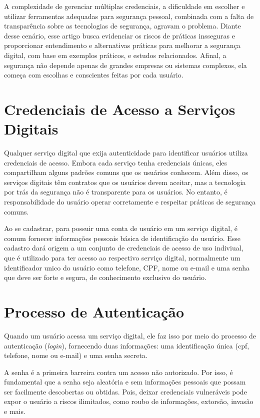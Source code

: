 \documentclass[12pt]{article}
\begin{document}
A complexidade de gerenciar múltiplas credenciais, a dificuldade em escolher e utilizar
ferramentas adequadas para segurança pessoal, combinada com a falta de transparência
sobre as tecnologias de segurança, agravam o problema.
Diante desse cenário, esse artigo busca evidenciar os riscos de práticas insseguras e
proporcionar entendimento e alternativas práticas para melhorar a segurança digital, com
base em exemplos práticos, e estudos relacionados.
Afinal, a segurança não depende apenas de grandes empresas ou sistemas complexos,
ela começa com escolhas e conscientes feitas por cada usuário.

\section{Credenciais de Acesso a Serviços Digitais} \label{sec:firstpage}

Qualquer serviço digital que exija autenticidade para identificar usuários
utiliza credenciais de acesso.
Embora cada serviço tenha credenciais únicas, eles compartilham alguns
padrões comuns que os usuários conhecem.
Além disso, os serviços digitais têm contratos que os usuários devem aceitar,
mas a tecnologia por trás da segurança não é transparente para os usuários.
No entanto, é responsabilidade do usuário operar corretamente e respeitar
práticas de segurança comuns.

Ao se cadastrar, para possuir uma conta de usuário em um serviço digital,
é comum fornecer informações pessoais básica de identificação do usuário.
Esse cadastro dará origem a um conjunto de credenciais de acesso de uso
indiviual, que é utilizado para ter acesso ao respectivo serviço digital,
normalmente um identificador unico do usuário como telefone, CPF, nome ou
e-mail e uma senha que deve ser forte e segura, de conhecimento exclusivo
do usuário.

\section{Processo de Autenticação}

Quando um usuário acessa um serviço digital, ele faz isso por meio do
processo de autenticação (\textit{login}), fornecendo duas informações: uma
identificação única (cpf, telefone, nome ou e-mail) e uma senha secreta.

A senha é a primeira barreira contra um acesso não autorizado.
Por isso, é fundamental que a senha seja aleatória e sem informações
pessoais que possam ser facilmente descobertas ou obtidas.
Pois, deixar credenciais vulneráveis pode expor o usuário a riscos ilimitados,
como roubo de informações, extorsão, invasão e mais.
\end{document}
